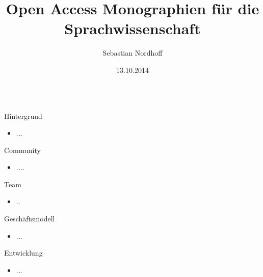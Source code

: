 \documentclass[final,utf8]{beamer}
\title{\Huge Open Access Monographien für die Sprachwissenschaft}
\author{Sebastian Nordhoff}
\institute[LangSci] %
{Language Science Press}
\date{13.10.2014}
\begin{document}
\begin{frame}{} 
\vspace{-1cm}
\begin{columns}[t]
  \begin{column}{.45\linewidth}
    

    \begin{block}{Hintergrund}
      \begin{itemize}
      \item ...
      \end{itemize}
    \end{block}
   
    \begin{block}{Community}
      \begin{itemize}
      \item ....
      \end{itemize}
    \end{block}

    \begin{block}{Team}
      \begin{itemize}
      \item ..
      \end{itemize}
    \end{block}

    \begin{block}{Geschäftsmodell}
      \begin{itemize}
      \item ...
      \end{itemize} 
    \end{block}

    \begin{block}{Entwicklung}
      \begin{itemize}
      \item ...
      \end{itemize} 
    \end{block}

    
   
  \end{column}
  \begin{column}{.45\linewidth}
 

\end{column}
\end{columns}
\end{frame}
\end{document}

